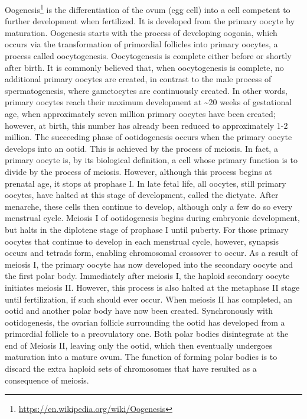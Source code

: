 \documentclass[]{book}
\let\rmarkdownfootnote\footnote%
\def\footnote{\protect\rmarkdownfootnote}
\renewcommand{\href}[2]{#2\footnote{\url{#1}}}
\begin{document}
\href{https://en.wikipedia.org/wiki/Oogenesis}{Oogenesis} is the differentiation of the ovum (egg cell) into a cell competent to further development when fertilized. It is developed from the primary oocyte by maturation. Oogenesis starts with the process of developing oogonia, which occurs via the transformation of primordial follicles into primary oocytes, a process called oocytogenesis. Oocytogenesis is complete either before or shortly after birth. It is commonly believed that, when oocytogenesis is complete, no additional primary oocytes are created, in contrast to the male process of spermatogenesis, where gametocytes are continuously created. In other words, primary oocytes reach their maximum development at \textasciitilde{}20 weeks of gestational age, when approximately seven million primary oocytes have been created; however, at birth, this number has already been reduced to approximately 1-2 million.
The succeeding phase of ootidogenesis occurs when the primary oocyte develops into an ootid. This is achieved by the process of meiosis. In fact, a primary oocyte is, by its biological definition, a cell whose primary function is to divide by the process of meiosis. However, although this process begins at prenatal age, it stops at prophase I. In late fetal life, all oocytes, still primary oocytes, have halted at this stage of development, called the dictyate. After menarche, these cells then continue to develop, although only a few do so every menstrual cycle. Meiosis I of ootidogenesis begins during embryonic development, but halts in the diplotene stage of prophase I until puberty. For those primary oocytes that continue to develop in each menstrual cycle, however, synapsis occurs and tetrads form, enabling chromosomal crossover to occur. As a result of meiosis I, the primary oocyte has now developed into the secondary oocyte and the first polar body. Immediately after meiosis I, the haploid secondary oocyte initiates meiosis II. However, this process is also halted at the metaphase II stage until fertilization, if such should ever occur. When meiosis II has completed, an ootid and another polar body have now been created. Synchronously with ootidogenesis, the ovarian follicle surrounding the ootid has developed from a primordial follicle to a preovulatory one. Both polar bodies disintegrate at the end of Meiosis II, leaving only the ootid, which then eventually undergoes maturation into a mature ovum. The function of forming polar bodies is to discard the extra haploid sets of chromosomes that have resulted as a consequence of meiosis.
\end{document}
